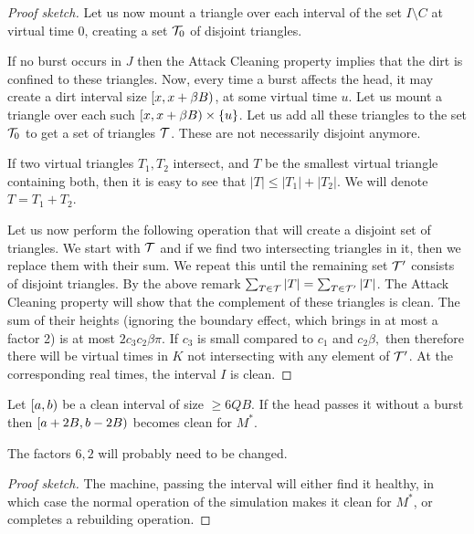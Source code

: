 \documentclass[12pt]{memoir}
\renewcommand{\le}{\leq}
\renewcommand{\ge}{\geq}
\def\B{B}
\newcommand{\Q}{Q}
\begin{document}
\begin{proof}[Proof sketch]
Let us now mount a triangle over each interval of the set \( I\setminus C \)
at virtual time 0, creating a set \( \mathcal{T}_{0} \) of disjoint triangles.

If no burst occurs in \( J \) 
then the Attack Cleaning property implies that the dirt is confined to these triangles.
Now, every time a burst affects the head, it may create a dirt interval 
size \( \lint{x}{x+\beta\B} \), at some virtual time \( u \).
Let us mount a triangle over each such \( \lint{x}{x+\beta\B}\times\{u\} \).
Let us add all these triangles to the set \( \mathcal{T}_{0} \) to get a set of
triangles \( \mathcal{T} \).
These are not necessarily disjoint anymore.

If two virtual triangles \( T_{1},T_{2} \) intersect,
and \( T \) be the smallest virtual triangle containing both,
then it is easy to see that \( |T|\le|T_{1}|+|T_{2}| \).
We will denote \( T=T_{1}+T_{2} \).

Let us now perform the following operation that will create a disjoint set
of triangles.
We start with \( \mathcal{T} \) and if we find two intersecting triangles 
in it, then we replace them with their sum.
We repeat this until the remaining set \( \mathcal{T}' \) consists of disjoint triangles.
By the above remark \( \sum_{T\in \mathcal{T}}|T| = \sum_{T\in \mathcal{T}'}|T| \).
The Attack Cleaning property will show that the complement of these triangles
is clean.
The sum of their heights (ignoring the boundary effect, which brings in at most a factor 2) is
at most \( 2 c_{3}c_{2}\beta\pi \).
If \( c_{3} \) is small compared to \( c_{1}  \) and \( c_{2}\beta, \) 
then therefore there will be virtual
times in \( K \) not intersecting with any element of \( \mathcal{T}' \).
At the corresponding real times, the interval \( I \) is clean.
\end{proof}

\begin{lemma}\label{lem:rebuild-pass}
  Let \( \left[a,b\right) \) be a clean interval of size \( \ge 6 \Q\B \).
If the head passes it without a burst then \( \lint{a+2\B}{b-2\B} \)
becomes clean for \( M^{*} \).
\end{lemma}
The factors \( 6,2 \) will probably need to be changed.
\begin{proof}[Proof sketch]
  The machine, passing the interval will either find it healthy, in which case
the normal operation of the simulation makes it clean for \( M^{*} \),
or completes a rebuilding operation.
\end{proof}
\end{document}
